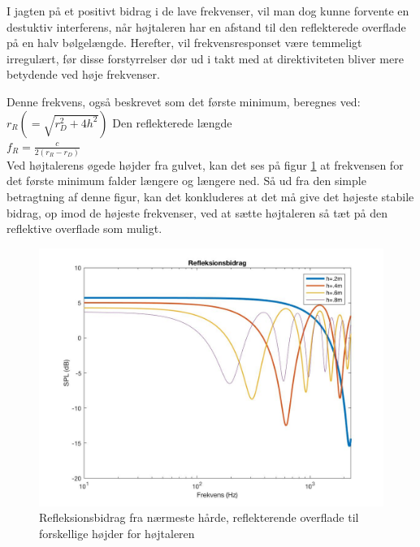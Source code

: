 I jagten på et positivt bidrag i de lave frekvenser, vil man dog kunne forvente en destuktiv interferens, når højtaleren har en afstand til den reflekterede overflade på en halv bølgelængde. Herefter, vil frekvensresponset være temmeligt irregulært, før disse forstyrrelser dør ud i takt med at direktiviteten bliver mere betydende ved høje frekvenser. 

Denne frekvens, også beskrevet som det første minimum, beregnes ved:\\

\(r_R(=\sqrt{r_D^2+4h^2})\) \hspace{2cm}Den reflekterede længde\\
\(f_R=\frac{c}{2(r_R-r_D)}\)\\

Ved højtalerens øgede højder fra gulvet, kan det ses på figur \ref{fig:refleksionsbidrag} at frekvensen for det første minimum falder længere og længere ned. Så ud fra den simple betragtning af denne figur, kan det konkluderes at det må give det højeste stabile bidrag, op imod de højeste frekvenser, ved at sætte højtaleren så tæt på den reflektive overflade som muligt.

\begin{figure}[h!]
	\centering
	\includegraphics[width=\textwidth]{Pics/refleksionsbidrag}
	\caption{Refleksionsbidrag fra nærmeste hårde, reflekterende overflade til forskellige højder for højtaleren } 
	\label{fig:refleksionsbidrag}
\end{figure}




